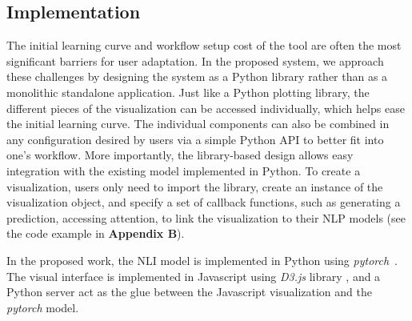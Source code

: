 \subsection{Implementation}
\label{sec:implementation}
The initial learning curve and workflow setup cost of the tool are often the most significant barriers for user adaptation.
In the proposed system, we approach these challenges by designing the system as a Python library rather than as a monolithic standalone application. 
Just like a Python plotting library, the different pieces of the visualization can be accessed individually, which helps ease the initial learning curve. 
The individual components can also be combined in any configuration desired by users via a simple Python API to better fit into one's workflow.
More importantly, the library-based design allows easy integration with the existing model implemented in Python.
%
To create a visualization, users only need to import the library, create an instance of the visualization object, and specify a set of callback functions, such as generating a prediction, accessing attention, to link the visualization to their NLP models (see the code example in \textbf{Appendix B}). 


%
In the proposed work, the NLI model is implemented in Python using \emph{pytorch}~\cite{PaszkeGrossChintala2017}.
The visual interface is implemented in Javascript using \emph{D3.js} library , and a Python server act as the glue between the Javascript visualization and the \emph{pytorch} model.
